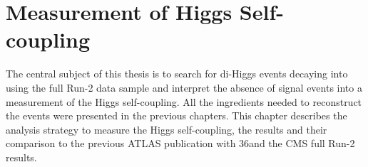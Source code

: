 \newpage
\chapter{Measurement of Higgs Self-coupling}
\label{HHyybb}

The central subject of this thesis is to search for di-Higgs events decaying into \HHyybb using the full Run-2 data sample and interpret the absence of signal events into a measurement of the Higgs self-coupling. All the ingredients needed to reconstruct the \HHyybb events were presented in the previous chapters. This chapter describes the analysis strategy to measure the Higgs self-coupling, the results and their comparison to the previous ATLAS publication with 36\ifb and the CMS full Run-2 results.  

